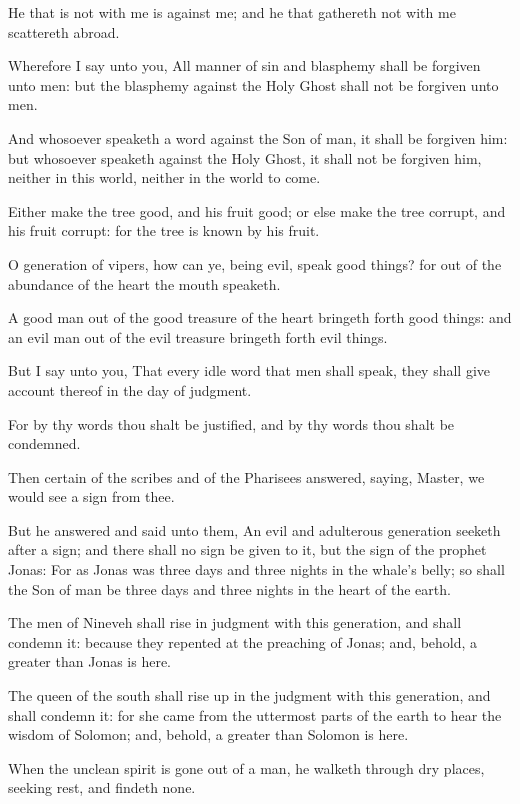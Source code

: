 \Verse He that is not with me is against me; and he that gathereth not with me scattereth abroad.

\Verse Wherefore I say unto you, All manner of sin and blasphemy shall be forgiven unto men: but the blasphemy against the Holy Ghost shall not be forgiven unto men.

\Verse And whosoever speaketh a word against the Son of man, it shall be forgiven him: but whosoever speaketh against the Holy Ghost, it shall not be forgiven him, neither in this world, neither in the world to come.

\Verse Either make the tree good, and his fruit good; or else make the tree corrupt, and his fruit corrupt: for the tree is known by his fruit.

\Verse O generation of vipers, how can ye, being evil, speak good things?  for out of the abundance of the heart the mouth speaketh.

\Verse A good man out of the good treasure of the heart bringeth forth good things: and an evil man out of the evil treasure bringeth forth evil things.

\Verse But I say unto you, That every idle word that men shall speak, they shall give account thereof in the day of judgment.

\Verse For by thy words thou shalt be justified, and by thy words thou shalt be condemned.

\Verse Then certain of the scribes and of the Pharisees answered, saying, Master, we would see a sign from thee.

\Verse But he answered and said unto them, An evil and adulterous generation seeketh after a sign; and there shall no sign be given to it, but the sign of the prophet Jonas: \Verse For as Jonas was three days and three nights in the whale's belly; so shall the Son of man be three days and three nights in the heart of the earth.

\Verse The men of Nineveh shall rise in judgment with this generation, and shall condemn it: because they repented at the preaching of Jonas; and, behold, a greater than Jonas is here.

\Verse The queen of the south shall rise up in the judgment with this generation, and shall condemn it: for she came from the uttermost parts of the earth to hear the wisdom of Solomon; and, behold, a greater than Solomon is here.

\Verse When the unclean spirit is gone out of a man, he walketh through dry places, seeking rest, and findeth none.

